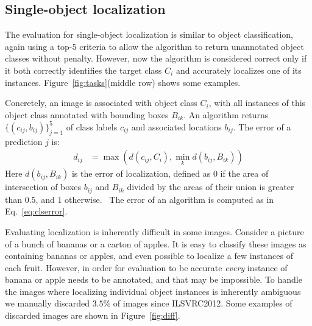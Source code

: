 \subsection{Single-object localization}
\label{sec:EvaluationLoc}

The evaluation for single-object localization is similar to object classification, again using a top-5 criteria to allow the algorithm to return unannotated object classes without penalty. However, now the algorithm is considered correct only if it both correctly identifies the target class $C_i$ and accurately localizes one of its instances. Figure~\ref{fig:tasks}(middle row) shows some examples.

Concretely, an image is associated with object class $C_i$, with all instances of this object class annotated with bounding boxes $B_{ik}$. An algorithm returns $\{(c_{ij},b_{ij})\}_{j=1}^5$ of class labels $c_{ij}$ and associated locations $b_{ij}$. The error of a prediction $j$ is:
\begin{align}
d_{ij} &= \max(d(c_{ij},C_i),\min_{k}d(b_{ij},B_{ik}))
\end{align}
Here $d(b_{ij},B_{ik})$ is the error of localization, defined as $0$ if the area of intersection of boxes $b_{ij}$ and $B_{ik}$ divided by the areas of their union is greater than $0.5$, and $1$ otherwise.~\citep{PASCALIJCV} The error of an algorithm is computed as in  Eq.~\ref{eq:clserror}.

Evaluating localization is inherently difficult in some images. Consider a picture of a bunch of bananas or a carton of apples. It is easy to classify these images as containing bananas or apples, and even possible to localize a few instances of each fruit. However, in order for evaluation to be accurate \emph{every} instance of banana or apple needs to be annotated, and that may be impossible.
To handle the images where localizing individual object instances is inherently ambiguous we manually discarded $3.5\%$ of images  since ILSVRC2012.  Some examples of discarded images are shown in Figure~\ref{fig:diff}.



